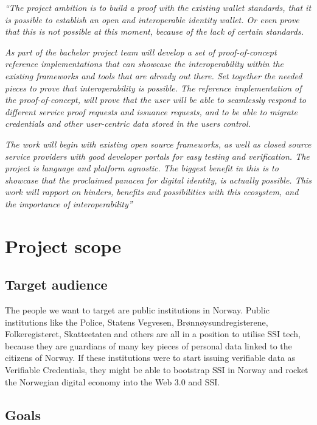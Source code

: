 \emph{``The project ambition is to build a proof with the existing
wallet standards, that it is possible to establish an open and
interoperable identity wallet. Or even prove that this is not possible
at this moment, because of the lack of certain standards.}

\emph{As part of the bachelor project team will develop a set of
proof-of-concept reference implementations that can showcase the
interoperability within the existing frameworks and tools that are
already out there. Set together the needed pieces to prove that
interoperability is possible. The reference implementation of the
proof-of-concept, will prove that the user will be able to seamlessly
respond to different service proof requests and issuance requests, and
to be able to migrate credentials and other user-centric data stored in
the users control.}

\emph{The work will begin with existing open source frameworks, as well
as closed source service providers with good developer portals for easy
testing and verification. The project is language and platform agnostic.
The biggest benefit in this is to showcase that the proclaimed panacea
for digital identity, is actually possible. This work will rapport on
hinders, benefits and possibilities with this ecosystem, and the
importance of interoperability''}

\hypertarget{project-scope}{%
\section{Project scope}\label{project-scope}}

\hypertarget{target-audience}{%
\subsection{Target audience}\label{target-audience}}

The people we want to target are public institutions in Norway. Public
institutions like the Police, Statens Vegvesen, Brønnøysundregisterene,
Folkeregisteret, Skatteetaten and others are all in a position to
utilise SSI tech, because they are guardians of many key pieces of
personal data linked to the citizens of Norway. If these institutions
were to start issuing verifiable data as Verifiable Credentials, they
might be able to bootstrap SSI in Norway and rocket the Norwegian
digital economy into the Web 3.0 and SSI.


\hypertarget{goals}{%
\subsection{Goals}\label{goals}}

